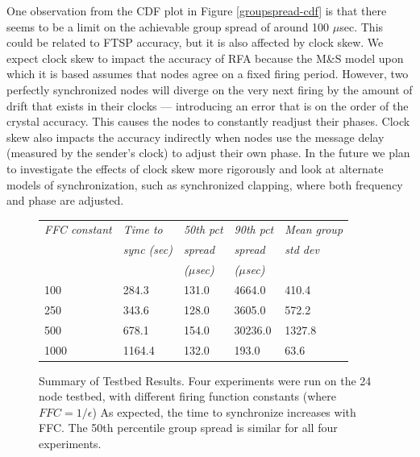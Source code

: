 \documentclass{sig-alternate}
\begin{document}
{One observation from the CDF plot in Figure \ref{groupspread-cdf} is
that there seems to be a limit on the achievable group spread of
around 100 $\mu$sec.  This could be related to FTSP accuracy, but it
is also affected by clock skew. We expect clock skew to impact the
accuracy of RFA because the M\&S model upon which it is based assumes
that nodes agree on a fixed firing period. However, two perfectly
synchronized nodes will diverge on the very next firing by the amount
of drift that exists in their clocks --- introducing an error that is on
the order of the crystal accuracy. This causes the nodes to constantly
readjust their phases. Clock skew also impacts the accuracy indirectly
when nodes use the message delay (measured by the sender's clock) to
adjust their own phase. In the future we plan to investigate the
effects of clock skew more rigorously and look at alternate models of
synchronization, such as synchronized clapping, where both frequency
and phase are adjusted.


\begin{figure}[t]
\begin{center}
\begin{small}
\begin{tabular}{|lllll|} \hline
{\em FFC constant} & 
{\em Time to} & 
{\em 50th pct} &
{\em 90th pct} &
{\em Mean group} \\
{\em } &
{\em sync (sec)} &
{\em spread} & 
{\em spread} & 
{\em std dev} \\
&
&
{\em ($\mu$sec)} & 
{\em ($\mu$sec)} & 
\\
\hline
100 & 284.3 & 131.0 & 4664.0 & 410.4 \\
250 & 343.6 & 128.0 & 3605.0 & 572.2 \\
500 & 678.1 & 154.0 & 30236.0 & 1327.8 \\
1000 & 1164.4 & 132.0 & 193.0 & 63.6 \\
\hline
\end{tabular}
\end{small}
\end{center}
\caption{Summary of Testbed Results. Four experiments were run on the
24 node testbed, with different firing function constants (where $FFC
= 1/\epsilon$) As expected, the time to synchronize increases with
FFC. The 50th percentile group spread is similar for all four
experiments.}
\label{motelab-summary}
\end{figure}

}
\end{document}
